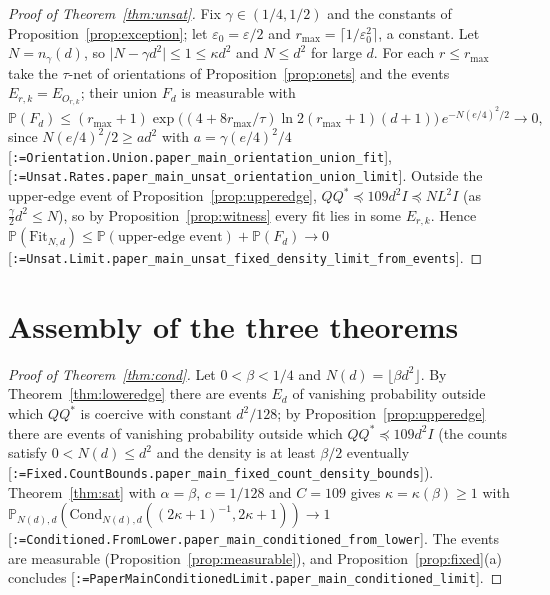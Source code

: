 \documentclass[11pt]{article}
\makeatletter
\newcommand{\formal@break}[1]{\@tfor\formal@tok:=#1\do{%
  \formal@tok
  \expandafter\ifx\formal@tok.\allowbreak\else
  \expandafter\ifx\formal@tok\_\allowbreak\fi\fi}}
\DeclareRobustCommand{\formal}[1]{\textnormal{[\texttt{\small\formal@break{#1}}]}}
\newcommand{\Prob}{\mathbb{P}}
\newcommand{\abs}[1]{\lvert #1\rvert}
\newcommand{\Id}{I}
\newcommand{\Fit}{\mathrm{Fit}}
\newcommand{\Cond}{\mathrm{Cond}}
\theoremstyle{plain}
\theoremstyle{definition}
\makeatother
\begin{document}
\begin{proof}[Proof of Theorem~\ref{thm:unsat}]
Fix $\gamma \in (1/4, 1/2)$ and the constants of Proposition~\ref{prop:exception};
let $\varepsilon_0 = \varepsilon/2$ and $r_{\max} = \lceil 1/\varepsilon_0^2\rceil$,
a constant. Let $N = n_\gamma(d)$, so $\abs{N - \gamma d^2} \le 1 \le \kappa d^2$
and $N \le d^2$ for large $d$. For each $r \le r_{\max}$ take the $\tau$-net of
orientations of Proposition~\ref{prop:onets} and the events
$E_{r,k} = E_{O_{r,k}}$; their union $F_d$ is measurable with
\[
\Prob(F_d) \le (r_{\max} + 1)\exp\bigl((4 + 8r_{\max}/\tau)\ln2(r_{\max}+1)(d+1)\bigr)\,e^{-N(e/4)^2/2} \to 0,
\]
since $N(e/4)^2/2 \ge ad^2$ with $a = \gamma(e/4)^2/4$
\formal{Orientation.Union.paper\_main\_orientation\_union\_fit},
\formal{Unsat.Rates.paper\_main\_unsat\_orientation\_union\_limit}. Outside
the upper-edge event of Proposition~\ref{prop:upperedge}, $QQ^{*} \preceq 109d^2\Id \preceq NL^2\Id$
(as $\frac\gamma2d^2 \le N$), so by Proposition~\ref{prop:witness} every fit
lies in some $E_{r,k}$. Hence
$\Prob(\Fit_{N,d}) \le \Prob(\text{upper-edge event}) + \Prob(F_d) \to 0$
\formal{Unsat.Limit.paper\_main\_unsat\_fixed\_density\_limit\_from\_events}.
\end{proof}

\section{Assembly of the three theorems}\label{sec:assembly}

\begin{proof}[Proof of Theorem~\ref{thm:cond}]
Let $0 < \beta < 1/4$ and $N(d) = \lfloor\beta d^2\rfloor$. By
Theorem~\ref{thm:loweredge} there are events $E_d$ of vanishing probability
outside which $QQ^{*}$ is coercive with constant $d^2/128$; by
Proposition~\ref{prop:upperedge} there are events of vanishing probability
outside which $QQ^{*} \preceq 109d^2\Id$ (the counts satisfy $0 < N(d) \le d^2$
and the density is at least $\beta/2$ eventually
\formal{Fixed.CountBounds.paper\_main\_fixed\_count\_density\_bounds}).
Theorem~\ref{thm:sat} with $\alpha = \beta$, $c = 1/128$ and $C = 109$ gives
$\kappa = \kappa(\beta) \ge 1$ with
$\Prob_{N(d),d}(\Cond_{N(d),d}((2\kappa+1)^{-1}, 2\kappa+1)) \to 1$
\formal{Conditioned.FromLower.paper\_main\_conditioned\_from\_lower}. The
events are measurable (Proposition~\ref{prop:measurable}), and
Proposition~\ref{prop:fixed}(a) concludes
\formal{PaperMainConditionedLimit.paper\_main\_conditioned\_limit}.
\end{proof}
\end{document}
